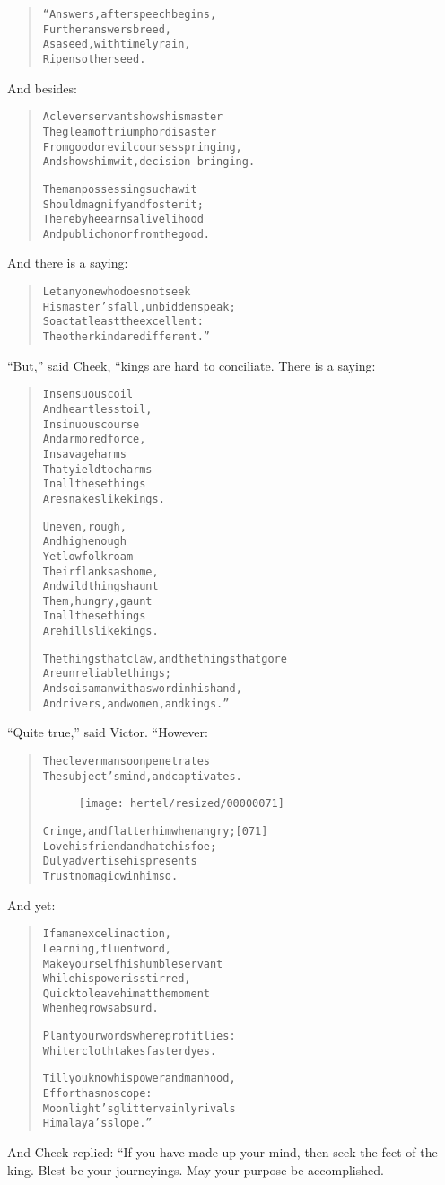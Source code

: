 \documentclass[article, twoside, 10pt]{memoir}
\renewenvironment{verbatim}{%
\begin{quote}%
\vskip -10pt%
\begin{alltt}\normalfont\small}{\end{alltt}%
\end{quote}%
\vskip -10pt
} %
\begin{document}
\begin{verbatim}
“Answers, after speech begins,
    Further answers breed,
As a seed, with timely rain,
    Ripens other seed.
\end{verbatim}
And besides:

\begin{verbatim}
A clever servant shows his master
The gleam of triumph or disaster
From good or evil courses springing,
And shows him wit, decision-bringing.

The man possessing such a wit
Should magnify and foster it;
Thereby he earns a livelihood
And public honor from the good.
\end{verbatim}
And there is a saying:

\begin{verbatim}
Let anyone who does not seek
His master's fall, unbidden speak;
So act at least the excellent:
The other kind are different.”
\end{verbatim}
``But,'' said Cheek, “kings are hard to conciliate. There is a
saying:

\begin{verbatim}
In sensuous coil
And heartless toil,
In sinuous course
And armored force,
In savage harms
That yield to charms{\textemdash}
In all these things
Are snakes like kings.

Uneven, rough,
And high enough{\textemdash}
Yet low folk roam
Their flanks as home,
And wild things haunt
Them, hungry, gaunt{\textemdash}
In all these things
Are hills like kings.

The things that claw, and the things that gore
    Are unreliable things;
And so is a man with a sword in his hand,
    And rivers, and women, and kings.”
\end{verbatim}
``Quite true,'' said Victor. “However:

\begin{verbatim}
The clever man soon penetrates
The subject's mind, and captivates.

\begin{figure}[p]\texttt{[image: hertel/resized/00000071]}\end{figure}Cringe, and flatter him when angry;                     [071]
    Love his friend and hate his foe;
Duly advertise his presents{\textemdash}
    Trust no magic{\textemdash}win him so.
\end{verbatim}
And yet:

\begin{verbatim}
If a man excel in action,
    Learning, fluent word,
Make yourself his humble servant
    While his power is stirred,
Quick to leave him at the moment
    When he grows absurd.

Plant your words where profit lies:
Whiter cloth takes faster dyes.

Till you know his power and manhood,
    Effort has no scope:
Moonlight's glitter vainly rivals
    Himalaya's slope.”
\end{verbatim}
And Cheek replied: “If you have made up your mind, then seek the
feet of the king. Blest be your journeyings. May your purpose be
accomplished.
\end{document}
